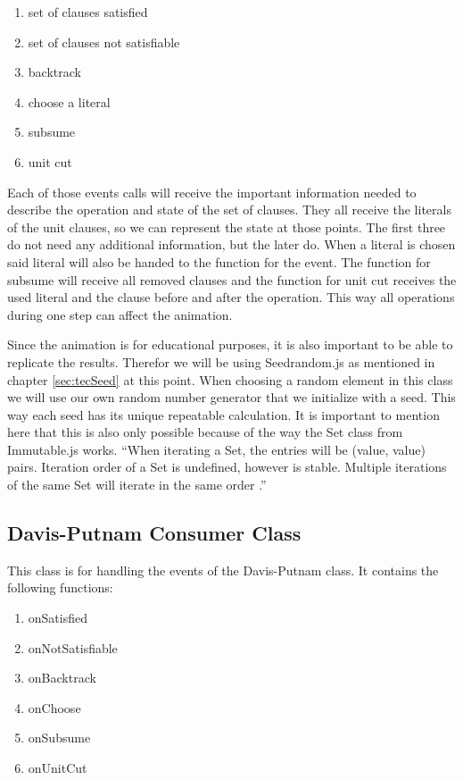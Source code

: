 \begin{enumerate}
    \item set of clauses satisfied
    \item set of clauses not satisfiable
    \item backtrack
    \item choose a literal
    \item subsume
    \item unit cut
\end{enumerate}

Each of those events calls will receive the important information needed to describe the operation and state of the set of clauses. They all receive the literals of the unit clauses, so we can represent the state at those points. The first three do not need any additional information, but the later do. When a literal is chosen said literal will also be handed to the function for the event. The function for subsume will receive all removed clauses and the function for unit cut receives the used literal and the clause before and after the operation. This way all operations during one step can affect the animation.

Since the animation is for educational purposes, it is also important to be able to replicate the results. Therefor we will be using Seedrandom.js as mentioned in chapter \ref{sec:tecSeed} at this point. When choosing a random element in this class we will use our own random number generator that we initialize with a seed. This way each seed has its unique repeatable calculation. It is important to mention here that this is also only possible because of the way the Set class from Immutable.js works. ``When iterating a Set, the entries will be (value, value) pairs. Iteration order of a Set is undefined, however is stable. Multiple iterations of the same Set will iterate in the same order \cite{ImmutableDevelopers2019a}.'' %

\subsection{Davis-Putnam Consumer Class}
\label{sub:impDavisPutnamConsumer}
This class is for handling the events of the Davis-Putnam class. It contains the following functions:

\begin{enumerate}
    \item onSatisfied
    \item onNotSatisfiable
    \item onBacktrack
    \item onChoose
    \item onSubsume
    \item onUnitCut
\end{enumerate}

